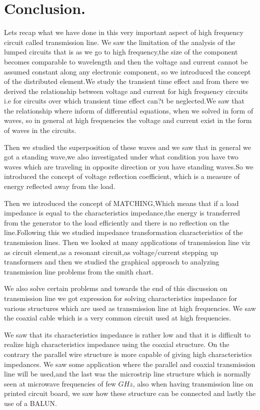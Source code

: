 \section{Conclusion.}
Lets recap what we have done in this very important aspect of high frequency circuit called transmission line. We saw the limitation of the analysis of the lumped circuits that is as we go to high frequency,the size of the component becomes comparable to wavelength and then the voltage and current cannot be assumed constant along any electronic component, so we introduced the concept of the distributed element.We study the transient time effect and from there we derived the relationship between voltage and current for high frequency circuits i.e for circuits over which transient time effect can?t be neglected.We saw that the relationship where inform of differential equations, when we solved in form of waves, so in general at high frequencies the voltage and current exist in the form of waves in the circuits.

Then we studied the superposition of these waves and we saw that in general we got a standing wave,we also investigated under what condition you have two waves which are traveling in opposite direction or you have standing waves.So we introduced the concept of voltage reflection coefficient, which is a measure of energy reflected away  from the load.

Then we introduced the concept of MATCHING,Which means that if a load impedance is equal to the characteristics impedance,the energy is transferred from the generator to the load efficiently and there is no reflection on the line.Following this we studied impedance transformation characteristics of the  transmission lines. Then we looked at many applications of transmission line viz as circuit element,as a resonant circuit,as voltage/current stepping up transformers  and then we studied the graphical approach to analyzing  transmission line problems from the smith chart.

We also solve certain problems and towards the end of this discussion on transmission line we got expression for solving characteristics impedance for various structures which are used as transmission line at high frequencies. We saw the coaxial cable which is a very common circuit used at high frequencies.

We saw that its characteristics impedance is rather low and that it is difficult to realize high characteristics impedance using the coaxial structure. On the contrary the parallel wire structure is more capable of giving high characteristics impedances. We saw some application where the parallel and coaxial transmission line will be used,and the last was the microstrip line structure which is normally seen at microwave frequencies of few $GHz$, also when having transmission line on printed circuit board, we saw how these structure can be connected and lastly the use of a BALUN.

